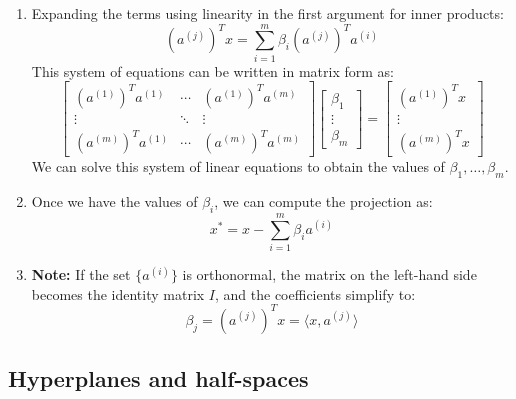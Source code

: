 \begin{derivation}
\begin{enumerate}
            \item Expanding the terms using linearity in the first argument for inner products:
            \[
            (a^{(j)})^T x = \sum_{i=1}^{m} \beta_i (a^{(j)})^T a^{(i)}
            \]
            This system of equations can be written in matrix form as:
            \[
            \begin{bmatrix}
            (a^{(1)})^T a^{(1)} & \cdots & (a^{(1)})^T a^{(m)} \\
            \vdots & \ddots & \vdots \\
            (a^{(m)})^T a^{(1)} & \cdots & (a^{(m)})^T a^{(m)}
            \end{bmatrix}
            \begin{bmatrix}
            \beta_1 \\
            \vdots \\
            \beta_m
            \end{bmatrix}
            =
            \begin{bmatrix}
            (a^{(1)})^T x \\
            \vdots \\
            (a^{(m)})^T x
            \end{bmatrix}
            \]
            We can solve this system of linear equations to obtain the values of $\beta_1, \dots, \beta_m$.
            
            \item Once we have the values of $\beta_i$, we can compute the projection as:
            \[
            x^* = x - \sum_{i=1}^{m} \beta_i a^{(i)}
            \]
            
            \item \textbf{Note:} If the set $\{a^{(i)}\}$ is orthonormal, the matrix on the left-hand side becomes the identity matrix $I$, and the coefficients simplify to:
            \[
            \beta_j = (a^{(j)})^T x = \langle x, a^{(j)} \rangle
            \]
        \end{enumerate}
    \end{derivation}
        
\subsection{Hyperplanes and half-spaces}